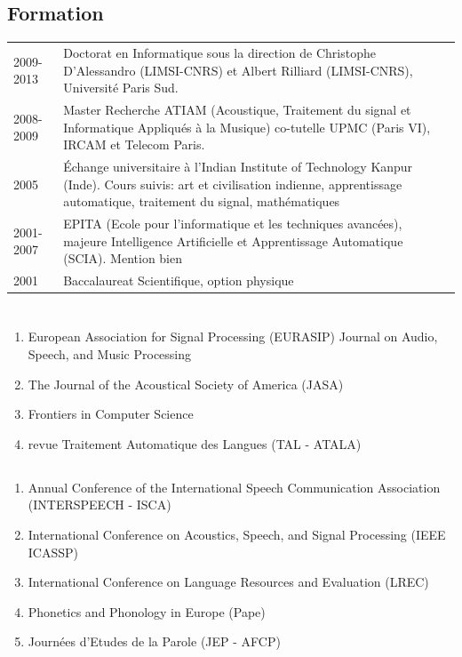 \begin{fr}
\section{Formation}
\begin{tabularx}{\linewidth}{@{}l X@{}}	
2009-2013 & Doctorat en Informatique sous la direction de Christophe D’Alessandro (LIMSI-CNRS) et Albert Rilliard (LIMSI-CNRS), Université Paris Sud.\\
2008-2009 & Master Recherche ATIAM (Acoustique, Traitement du signal et Informatique Appliqués à la Musique) co-tutelle UPMC (Paris VI), IRCAM et Telecom Paris.\\
2005 & \'Echange universitaire à l'Indian Institute of Technology Kanpur (Inde). Cours suivis: art et civilisation indienne, apprentissage automatique, traitement du signal, mathématiques\\
2001-2007 & EPITA (Ecole pour l'informatique et les techniques avancées), majeure Intelligence Artificielle et Apprentissage Automatique (SCIA). Mention bien\\
2001 & Baccalaureat Scientifique, option physique\\
\end{tabularx}
\end{fr}


\section{\EvalSec}
\subsection{\EvalJournal}
\begin{enumerate}
\item European Association for Signal Processing (EURASIP) Journal on Audio, Speech, and Music Processing
\item The Journal of the Acoustical Society of America (JASA)
\item Frontiers in Computer Science
\item revue Traitement Automatique des Langues (TAL - ATALA)
\end{enumerate}
\subsection{\EvalConf}
\begin{enumerate}
\item Annual Conference of the International Speech Communication Association (INTERSPEECH - ISCA)
\item International Conference on Acoustics, Speech, and Signal Processing (IEEE ICASSP)
\item International Conference on Language Resources and Evaluation (LREC)
\item Phonetics and Phonology in Europe (Pape)
\item Journées d’Etudes de la Parole (JEP - AFCP)
\end{enumerate}
